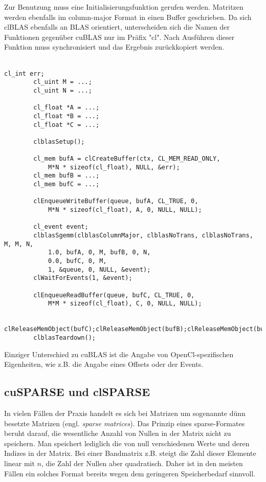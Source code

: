 		Zur Benutzung muss eine Initialisierungsfunktion gerufen werden. Matritzen werden ebenfalls im column-major Format in einen Buffer geschrieben. Da sich clBLAS ebenfalls an BLAS orientiert, unterscheiden sich die Namen der Funktionen gegenüber cuBLAS nur im Präfix "cl". Nach Ausführen dieser Funktion muss synchronisiert und das Ergebnis zurückkopiert werden.\\ \\
		\begin{lstlisting}[caption=clBLAS Beispiel]
		cl_int err;
		cl_uint M = ...;
		cl_uint N = ...;
		
		cl_float *A = ...; 
		cl_float *B = ...; 
		cl_float *C = ...;
		
		clblasSetup();
		
		cl_mem bufA = clCreateBuffer(ctx, CL_MEM_READ_ONLY,  
			M*N * sizeof(cl_float), NULL, &err); 
		cl_mem bufB = ...; 
		cl_mem bufC = ...;

		clEnqueueWriteBuffer(queue, bufA, CL_TRUE, 0, 
			M*N * sizeof(cl_float), A, 0, NULL, NULL);       
		 
		cl_event event;
		clblasSgemm(clblasColumnMajor, clblasNoTrans, clblasNoTrans, M, M, N,
			1.0, bufA, 0, M, bufB, 0, N, 
			0.0, bufC, 0, M,
			1, &queue, 0, NULL, &event);
		clWaitForEvents(1, &event);

		clEnqueueReadBuffer(queue, bufC, CL_TRUE, 0, 
			M*M * sizeof(cl_float), C, 0, NULL, NULL);

		clReleaseMemObject(bufC);clReleaseMemObject(bufB);clReleaseMemObject(bufA);
		clblasTeardown();
		\end{lstlisting}
		
		Einziger Unterschied zu cuBLAS ist die Angabe von OpenCl-spezifischen Eigenheiten, wie z.B. die Angabe eines Offsets oder	
der Events.
		
		\subsection{cuSPARSE und clSPARSE}
		In vielen Fällen der Praxis handelt es sich bei Matrizen um sogenannte dünn besetzte Matrizen (engl. \textit{sparse matrices}). Das Prinzip eines sparse-Formates beruht darauf, die wesentliche Anzahl von Nullen in der Matrix nicht zu speichern. Man speichert lediglich die von null verschiedenen Werte und deren Indizes in der Matrix. Bei einer Bandmatrix z.B. steigt die Zahl dieser Elemente linear mit $n$, die Zahl der Nullen aber quadratisch. Daher ist in den meisten Fällen ein solches Format bereits wegen dem geringeren Speicherbedarf sinnvoll. 
		
